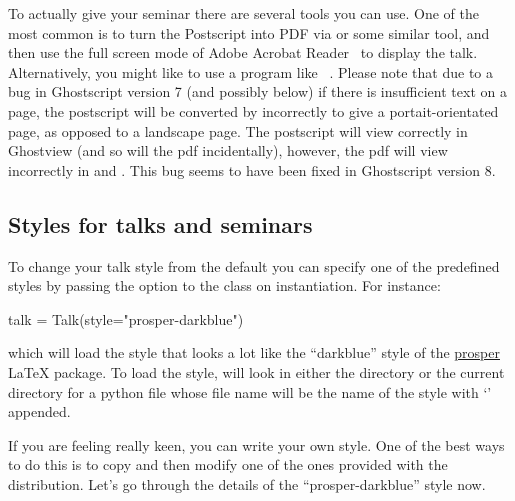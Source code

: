 To actually give your seminar there are several tools you can use.  One of
the most common is to turn the Postscript into PDF via  or some
similar tool, and then use the full screen mode of Adobe Acrobat
Reader~\cite{acroread} to display the talk.  Alternatively, you might like
to use a program like ~\cite{pspresent}.  Please note that
due to a bug in Ghostscript version 7 (and possibly below) if there is
insufficient text on a page, the postscript will be converted by
 incorrectly to give a portait-orientated page, as opposed to a
landscape page.  The postscript will view correctly in Ghostview (and so
will the pdf incidentally), however, the pdf will view incorrectly in
 and .  This bug seems to have been fixed in
Ghostscript version 8.

\subsection{Styles for talks and seminars}
\label{sec:styles}

To change your talk style from the default you can specify one of the
predefined styles by passing the  option to the 
class on instantiation.  For instance:
\begin{python}
talk = Talk(style="prosper-darkblue")
\end{python}
which will load the style that looks a lot like the ``darkblue'' style of
the \href{prosper}{prosper} \LaTeX{} package.  To load the style, \pyscript
will look in either the  directory or the current
directory for a python file whose file name will be the name of the style
with `' appended.

If you are feeling really keen, you can write your own style.  One of the
best ways to do this is to copy and then modify one of the ones provided
with the \pyscript distribution.  Let's go through the details of the
``prosper-darkblue'' style now.

